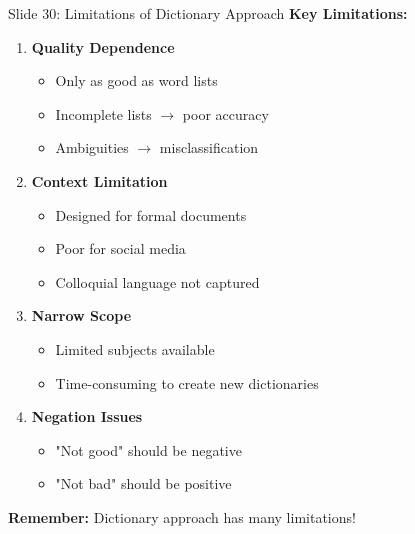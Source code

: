 \documentclass[8pt]{beamer}
\begin{document}
	\begin{frame}{Slide 30: Limitations of Dictionary Approach}
		\fontsize{6.5}{7.5}\selectfont
		\textbf{Key Limitations:}
		\begin{enumerate}
			\item \textbf{Quality Dependence}
			\begin{itemize}
				\item Only as good as word lists
				\item Incomplete lists $\to$ poor accuracy
				\item Ambiguities $\to$ misclassification
			\end{itemize}
			\item \textbf{Context Limitation}
			\begin{itemize}
				\item Designed for formal documents
				\item Poor for social media
				\item Colloquial language not captured
			\end{itemize}
			\item \textbf{Narrow Scope}
			\begin{itemize}
				\item Limited subjects available
				\item Time-consuming to create new dictionaries
			\end{itemize}
			\item \textbf{Negation Issues}
			\begin{itemize}
				\item "Not good" should be negative
				\item "Not bad" should be positive
			\end{itemize}
		\end{enumerate}
		
		\textcolor{myblue}{\textbf{Remember:}} Dictionary approach has many limitations!
	\end{frame}
	
\end{document}
